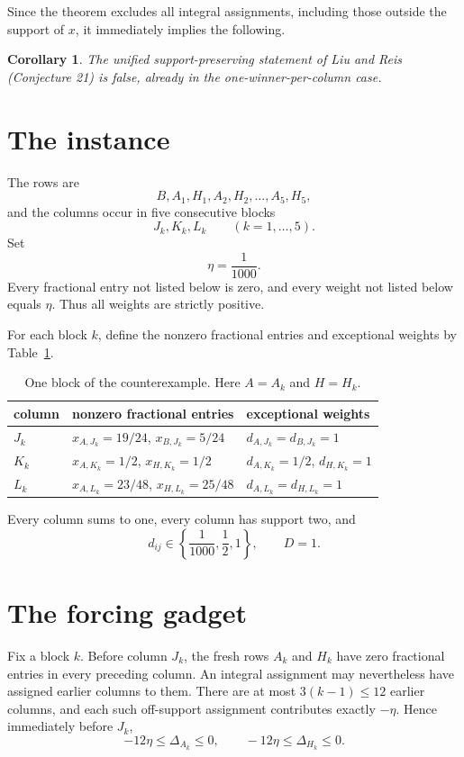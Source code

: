 \documentclass[11pt]{article}
\newtheorem{corollary}[theorem]{Corollary}
\theoremstyle{definition}
\newcommand{\disc}{\Delta}
\begin{document}
Since the theorem excludes all integral assignments, including those outside
the support of $x$, it immediately implies the following.

\begin{corollary}\label{cor:unified}
The unified support-preserving statement of Liu and Reis (Conjecture 21) is
false, already in the one-winner-per-column case.
\end{corollary}

\section{The instance}

The rows are
\[
 B,A_1,H_1,A_2,H_2,\ldots,A_5,H_5,
\]
and the columns occur in five consecutive blocks
\[
 J_k,K_k,L_k\qquad(k=1,\ldots,5).
\]
Set
\[
 \eta=\frac1{1000}.
\]
Every fractional entry not listed below is zero, and every weight not listed
below equals $\eta$.  Thus all weights are strictly positive.

For each block $k$, define the nonzero fractional entries and exceptional
weights by Table~\ref{tab:block}.

\begin{table}[ht]
\centering
\caption{One block of the counterexample.  Here $A=A_k$ and $H=H_k$.}
\label{tab:block}
\begin{tabular}{@{}lll@{}}
\toprule
column & nonzero fractional entries & exceptional weights \\
\midrule
$J_k$ & $x_{A,J_k}=19/24$, $x_{B,J_k}=5/24$
      & $d_{A,J_k}=d_{B,J_k}=1$ \\
$K_k$ & $x_{A,K_k}=1/2$, $x_{H,K_k}=1/2$
      & $d_{A,K_k}=1/2$, $d_{H,K_k}=1$ \\
$L_k$ & $x_{A,L_k}=23/48$, $x_{H,L_k}=25/48$
      & $d_{A,L_k}=d_{H,L_k}=1$ \\
\bottomrule
\end{tabular}
\end{table}

Every column sums to one, every column has support two, and
\[
 d_{ij}\in\left\{\frac1{1000},\frac12,1\right\},
 \qquad D=1.
\]

\section{The forcing gadget}

Fix a block $k$.  Before column $J_k$, the fresh rows $A_k$ and $H_k$ have
zero fractional entries in every preceding column.  An integral assignment
may nevertheless have assigned earlier columns to them.  There are at most
$3(k-1)\le12$ earlier columns, and each such off-support assignment contributes
exactly $-\eta$.  Hence immediately before $J_k$,
\begin{equation}\label{eq:fresh}
 -12\eta\le\disc_{A_k}\le0,
 \qquad
 -12\eta\le\disc_{H_k}\le0.
\end{equation}
\end{document}
